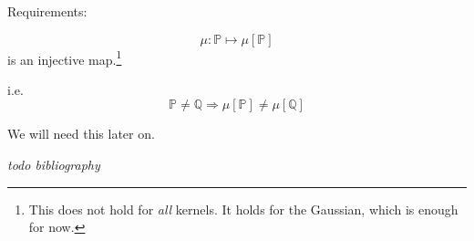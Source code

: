 \clearpage
Requirements:

	\begin{equation*}
		\mu: \mathbb{P} \mapsto \mu[\mathbb{P}]
	\end{equation*}
	is an injective map.\footnote{
		This does not hold for \emph{all} kernels.
		It holds for the Gaussian, which is enough for now.
	}
	
	i.e.
	\begin{equation*}
		\mathbb{P}\ne\mathbb{Q} \Rightarrow \mu[\mathbb{P}] \ne \mu[\mathbb{Q}]
	\end{equation*}
	
	We will need this later on.
	
	
\clearpage

\emph{todo bibliography}
\clearpage
\textcolor{white}{ %
Discussion, results, conclusion 
}


\ifoot{}%
\clearpage
%

 